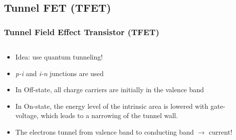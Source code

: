 \documentclass{beamer}
\begin{document}
\subsection{Tunnel FET (TFET)}
\begin{frame}\frametitle{Tunnel Field Effect Transistor (TFET)} 
\begin{columns}
\begin{column}{5.8cm}
\begin{overprint}
\begin{itemize}
\item Idea: use quantum tunneling!
\item \textit{p-i} and \textit{i-n} junctions are used
\end{itemize}

\begin{itemize}
\item In Off-state, all charge carriers are initially in the valence band 
\item In On-state, the energy level of the intrinsic area is lowered with gate-voltage, which leads to a narrowing of the tunnel wall.
\item The electrons tunnel from valence band to conducting band $\rightarrow$ current!
\end{itemize}
\end{overprint}

\end{column}
\begin{column}{6cm}
\begin{center}
\begin{overprint}



\end{overprint}
\end{center}
\end{column}
\end{columns}
\end{frame}
\end{document}
